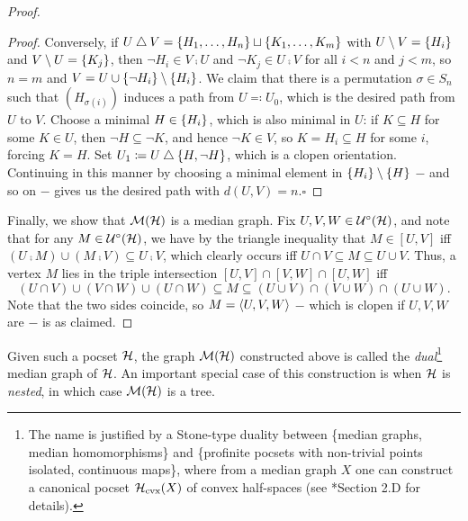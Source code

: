 \documentclass[reqno]{amsart}
\begin{document}
\begin{proof}
\begin{center}
\begin{minipage}{0.95\textwidth}
\begin{proof}
                    \hspace{0.2in}Conversely, if $U\bigtriangleup V=\left\{H_1,\dots,H_n\right\}\sqcup\left\{K_1,\dots,K_m\right\}$ with $U\setminus V=\left\{H_i\right\}$ and $V\setminus U=\left\{K_j\right\}$, then $\lnot H_i\in V\comp U$ and $\lnot K_j\in U\comp V$ for all $i<n$ and $j<m$, so $n=m$ and $V=U\cup\left\{\lnot H_i\right\}\setminus\left\{H_i\right\}$. We claim that there is a permutation $\sigma\in S_n$ such that $(H_{\sigma(i)})$ induces a path from $U\eqqcolon U_0$, which is the desired path from $U$ to $V$. Choose a minimal $H\in\left\{H_i\right\}$, which is also minimal in $U$: if $K\subseteq H$ for some $K\in U$, then $\lnot H\subseteq\lnot K$, and hence $\lnot K\in V$, so $K=H_i\subseteq H$ for some $i$, forcing $K=H$. Set $U_1\coloneqq U\bigtriangleup\left\{H,\lnot H\right\}$, which is a clopen orientation. Continuing in this manner by choosing a minimal element in $\left\{H_i\right\}\setminus\left\{H\right\}$ $-$ and so on $-$ gives us the desired path with $d(U,V)=n$.\phantom\qedhere\hfill$\square$
                \end{proof}
            \end{minipage}
        \end{center}
        Finally, we show that $\mathcal{M}(\mathcal{H})$ is a median graph. Fix $U,V,W\in\mathcal{U}^\circ(\mathcal{H})$, and note that for any $M\in\mathcal{U}^\circ(\mathcal{H})$, we have by the triangle inequality that $M\in[U,V]$ iff $(U\comp M)\cup(M\comp V)\subseteq U\comp V$, which clearly occurs iff $U\cap V\subseteq M\subseteq U\cup V$. Thus, a vertex $M$ lies in the triple intersection $[U,V]\cap[V,W]\cap[U,W]$ iff
        \begin{equation*}
            (U\cap V)\cup(V\cap W)\cup(U\cap W)\subseteq M\subseteq(U\cup V)\cap(V\cup W)\cap(U\cup W).
        \end{equation*}
        Note that the two sides coincide, so $M=\left\langle U,V,W\right\rangle$ $-$ which is clopen if $U,V,W$ are $-$ is as claimed.
    \end{proof}

    Given such a pocset $\mathcal{H}$, the graph $\mathcal{M}(\mathcal{H})$ constructed above is called the \textit{dual}\footnote{The name is justified by a Stone-type duality between \{median graphs, median homomorphisms\} and \{profinite pocsets with non-trivial points isolated, continuous maps\}, where from a median graph $X$ one can construct a canonical pocset $\mathcal{H}_\mathrm{cvx}(X)$ of convex half-spaces (see \cite{CPTT23}*{Section 2.D} for details).} median graph of $\mathcal{H}$. An important special case of this construction is when $\mathcal{H}$ is \textit{nested}, in which case $\mathcal{M}(\mathcal{H})$ is a tree.
\end{document}
